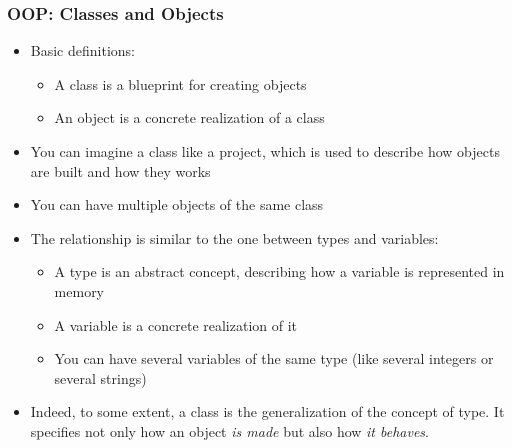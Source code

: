 \documentclass[9pt]{beamer}
\begin{document}
\begin{frame}
  \frametitle{OOP: Classes and Objects}

  \begin{itemize}
  \item Basic definitions:
    \begin{itemize}
    \item A \alert{class} is a blueprint for creating objects
    \item An \alert{object} is a concrete realization of a class
    \end{itemize}

  \smallskip

  \item You can imagine a class like a project, which is used to
        describe how objects are built and how they works

  \smallskip

  \item You can have multiple objects of the same class

  \smallskip

  \item The relationship is similar to the one between types and variables:
    \begin{itemize}
    \item A type is an abstract concept, describing how a variable is
          represented in memory
    \item A variable is a concrete realization of it
    \item You can have several variables of the same type (like several integers
          or several strings)
    \end{itemize}

  \smallskip

  \item Indeed, to some extent, a class is the generalization of the concept of
        type. It specifies not only how an object \emph{is made} but also how \emph{it behaves}.
  \end{itemize}

\end{frame}
\end{document}
